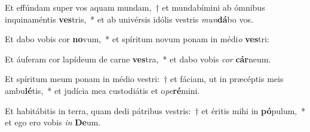 \item Et effúndam super vos aquam mundam,~† et mundabímini ab ómnibus inquinaméntis \textbf{ves}tris,~* et ab univérsis idólis vestris \textit{mun}\textbf{dá}bo vos.
\item Et dabo vobis cor \textbf{no}vum,~* et spíritum novum ponam in médi\textit{o} \textbf{ves}tri:
\item Et áuferam cor lapídeum de carne \textbf{ves}tra,~* et dabo vobis \textit{cor} \textbf{cár}neum.
\item Et spíritum meum ponam in médio vestri:~† et fáciam, ut in præcéptis meis ambu\textbf{lé}tis,~* et judícia mea custodiátis et o\textit{pe}\textbf{ré}mini.
\item Et habitábitis in terra, quam dedi pátribus vestris:~† et éritis mihi in \textbf{pó}pulum,~* et ego ero vobis \textit{in} \textbf{De}um.
